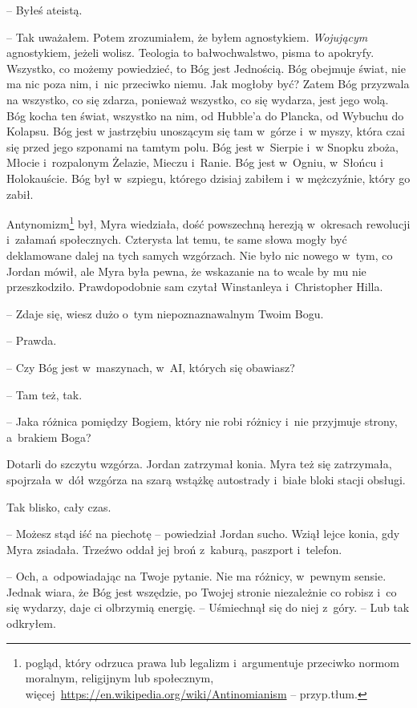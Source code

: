 \documentclass[oneside,polish,11pt,sfheadings]{mwbk}
\begin{document}
-- Byłeś ateistą.

-- Tak uważałem. Potem zrozumiałem, że byłem agnostykiem.
\textit{Wojującym} agnostykiem, jeżeli wolisz. Teologia to bałwochwalstwo,
pisma to apokryfy. Wszystko, co możemy powiedzieć, to Bóg jest
Jednością. Bóg obejmuje świat, nie ma nic poza nim, i~nic przeciwko
niemu. Jak mogłoby być? Zatem Bóg przyzwala na wszystko, co się zdarza,
ponieważ wszystko, co się wydarza, jest jego wolą. Bóg kocha ten świat,
wszystko na nim, od Hubble'a do Plancka, od Wybuchu do Kolapsu. Bóg jest
w jastrzębiu unoszącym się tam w~górze i~w myszy, która czai się przed
jego szponami na tamtym polu. Bóg jest w~Sierpie i~w Snopku zboża,
Młocie i~rozpalonym Żelazie, Mieczu i~Ranie. Bóg jest w~Ogniu, w~Słońcu
i Holokauście. Bóg był w~szpiegu, którego dzisiaj zabiłem i~w mężczyźnie, który go zabił.

Antynomizm\footnote{pogląd, który odrzuca prawa lub legalizm i~argumentuje
przeciwko normom moralnym, religijnym lub społecznym,
więcej~\url{https://en.wikipedia.org/wiki/Antinomianism} -- przyp.tłum.} był, Myra wiedziała, dość powszechną herezją w~okresach
rewolucji i~załamań społecznych. Czterysta lat temu, te same słowa mogły
być deklamowane dalej na tych samych wzgórzach. Nie było nic nowego w~tym, co Jordan mówił, ale Myra była pewna, że wskazanie na to wcale by
mu nie przeszkodziło. Prawdopodobnie sam czytał Winstanleya i~Christopher Hilla.

-- Zdaje się, wiesz dużo o~tym niepoznaznawalnym Twoim Bogu.

-- Prawda.

-- Czy Bóg jest w~maszynach, w~AI, których się obawiasz?

-- Tam też, tak.

-- Jaka różnica pomiędzy Bogiem, który nie robi różnicy i~nie przyjmuje
strony, a~brakiem Boga?

Dotarli do szczytu wzgórza. Jordan zatrzymał konia. Myra też się
zatrzymała, spojrzała w~dół wzgórza na szarą wstążkę autostrady i~białe
bloki stacji obsługi.

Tak blisko, cały czas.

-- Możesz stąd iść na piechotę -- powiedział Jordan sucho. Wziął lejce
konia, gdy Myra zsiadała. Trzeźwo oddał jej broń z~kaburą, paszport i~telefon.

-- Och, a~odpowiadając na Twoje pytanie. Nie ma różnicy, w~pewnym sensie.
Jednak wiara, że Bóg jest wszędzie, po Twojej stronie niezależnie co
robisz i~co się wydarzy, daje ci olbrzymią energię. -- Uśmiechnął się do
niej z~góry. -- Lub tak odkryłem.
\end{document}
